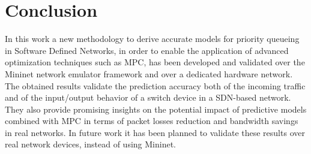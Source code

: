 \chapter*{Conclusion} 
In this work a new methodology to derive accurate models for priority queueing in Software Defined Networks, in order to enable the application of advanced optimization techniques such as MPC, has been developed and validated over the Mininet network emulator framework and over a dedicated hardware network. The obtained results validate the prediction accuracy both of the incoming traffic and of the input/output behavior of a switch device in a SDN-based network. They also provide promising insights on the potential impact of predictive models combined with MPC in terms of packet losses reduction and bandwidth savings in real networks. In future work it has been planned to validate these results over real network devices, instead of using Mininet.
